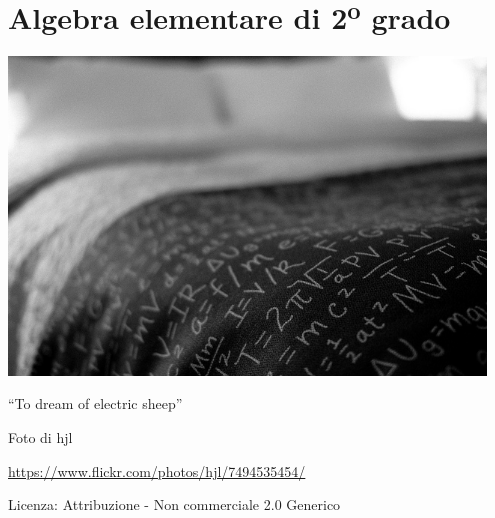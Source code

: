 \part{Algebra elementare di 2\textsuperscript{o} grado}

\includegraphics[width=0.95\textwidth]{img/eletric_sheep.jpg}
  \begin{center}
    {\large ``To dream of electric sheep''}\par
    Foto di hjl\par
    \url{https://www.flickr.com/photos/hjl/7494535454/}\par
    Licenza: Attribuzione - Non commerciale 2.0 Generico\par
  \end{center}
\clearpage
\cleardoublepage
